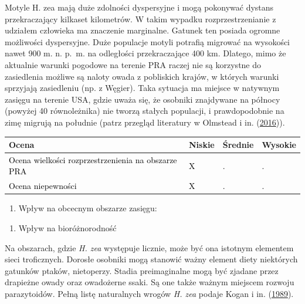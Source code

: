 \documentclass[polish,a4paper]{article}
\providecommand{\tightlist}{%
  \setlength{\itemsep}{0pt}\setlength{\parskip}{0pt}}
\begin{document}
Motyle H. zea mają duże zdolności dyspersyjne i mogą pokonywać dystans
przekraczający kilkaset kilometrów. W takim wypadku rozprzestrzenianie z
udziałem człowieka ma znaczenie marginalne. Gatunek ten posiada ogromne
możliwości dyspersyjne. Duże populacje motyli potrafią migrować na
wysokości nawet 900 m. n. p.~m. na odległości przekraczające 400 km.
Dlatego, mimo że aktualnie warunki pogodowe na terenie PRA raczej nie są
korzystne do zasiedlenia możliwe są naloty owada z pobliskich krajów, w
których warunki sprzyjają zasiedleniu (np. z Węgier). Taka sytuacja ma
miejsce w natywnym zasięgu na terenie USA, gdzie uważa się, że osobniki
znajdywane na północy (powyżej 40 równoleżnika) nie tworzą stałych
populacji, i prawdopodobnie na zimę migrują na południe (patrz przegląd
literatury w Olmstead i in.
(\protect\hyperlink{ref-olmstead2016}{2016})).

\begin{tabu} to 
\toprule
{}  \textbf{Ocena} & \textbf{Niskie} & \textbf{Średnie} & \textbf{Wysokie}\\
\midrule
{}  \textcolor{black}{Ocena wielkości rozprzestrzenienia na obszarze PRA} & \textcolor{black}{X} & \textcolor{black}{.} & \textcolor{black}{.}\\
  \textcolor{black}{Ocena niepewności} & \textcolor{black}{X} & \textcolor{black}{.} & \textcolor{black}{.}\\
\bottomrule
\end{tabu}

\begin{enumerate}
\def\labelenumi{(\arabic{enumi})}
\setcounter{enumi}{11}
\tightlist
\item
  Wpływ na obcecnym obszarze zasięgu:
\end{enumerate}

\begin{enumerate}
\def\labelenumi{\Roman{enumi})}
\tightlist
\item
  Wpływ na bioróżnorodność
\end{enumerate}

Na obszarach, gdzie \emph{H. zea} występuje licznie, może być ona
istotnym elementem sieci troficznych. Dorosłe osobniki mogą stanowić
ważny element diety niektórych gatunków ptaków, nietoperzy. Stadia
preimaginalne mogą być zjadane przez drapieżne owady oraz owadożerne
ssaki. Są one także ważnym miejscem rozwoju parazytoidów. Pełną listę
naturalnych wrogów \emph{H. zea} podaje Kogan i in.
(\protect\hyperlink{ref-kogan1989}{1989}).
\end{document}
